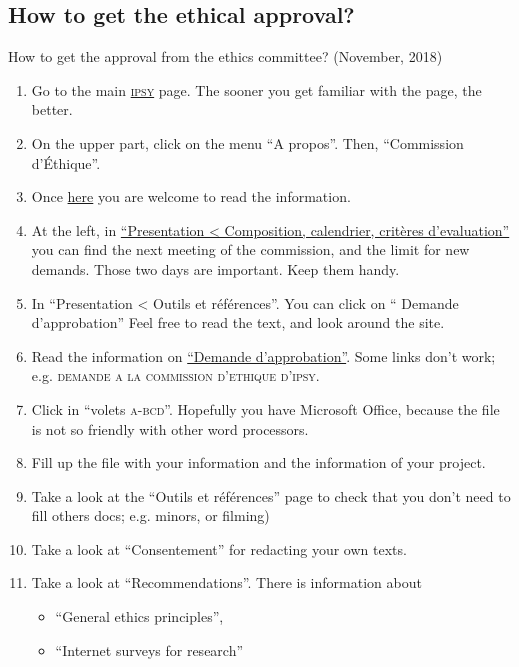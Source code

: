 \documentclass{article}
\begin{document}
\subsection{How to get the ethical approval?}
\label{subsec: ethic}
How to get the approval from the ethics committee? (November, 2018)
\begin{enumerate}
    \item Go to the main \href{https://uclouvain.be/fr/instituts-recherche/ipsy}{\textsc{ipsy}} page. The sooner you get familiar with the page, the better.
    \item On the upper part, click on the menu ``A propos''. Then, ``Commission d’Éthique''.
    \item Once \href{https://uclouvain.be/fr/instituts-recherche/ipsy/commission-d-ethique.html}{here} you are welcome to read the information. 
    \item At the left, in \href{https://uclouvain.be/fr/instituts-recherche/ipsy/composition-calendrier-criteres-d-evaluation.html}{``Presentation < Composition, calendrier, critères d’evaluation''} you can find the next meeting of the commission, and the limit for new demands. Those two days are important. Keep them handy.
    \item In ``Presentation <  Outils et références''. You can click on `` Demande d’approbation'' Feel free to read the text, and look around the site.
    \item Read the information on \href{https://uclouvain.be/fr/instituts-recherche/ipsy/demande-d-approbation-d-un-programme-de-recherche.html}{``Demande d’approbation''}.
    Some links don’t work; e.g. \textsc{demande a la commission d’ethique d’ipsy}.
    \item Click in ``volets \textsc{a-bcd}''. Hopefully you have Microsoft Office, because the file is not so friendly with other word processors. 
    \item Fill up the file with your information and the information of your project.
    \item Take a look at the ``Outils et références'' page to check that you don’t need to fill others docs; e.g. minors, or filming)
    \item Take a look at ``Consentement'' for redacting your own texts. 
    \item Take a look at ``Recommendations''. There is information about
    \begin{itemize}
        \item ``General ethics principles'', 
        \item ``Internet surveys for research''

\end{itemize}
\end{enumerate}
\end{document}
